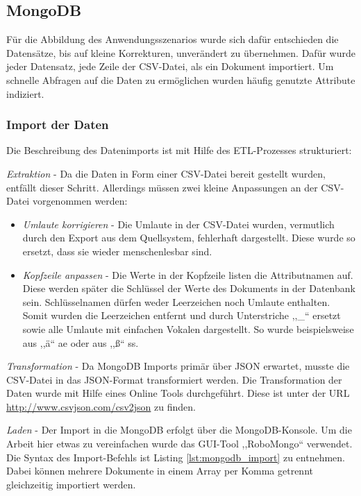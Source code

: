 \subsection{MongoDB}
Für die Abbildung des Anwendungsszenarios wurde sich dafür entschieden die Datensätze, bis auf kleine Korrekturen, unverändert zu übernehmen. Dafür wurde jeder Datensatz, jede Zeile der CSV-Datei, als ein Dokument importiert. Um schnelle Abfragen auf die Daten zu ermöglichen wurden häufig genutzte Attribute indiziert.

\subsubsection{Import der Daten}
Die Beschreibung des Datenimports ist mit Hilfe des ETL-Prozesses strukturiert:

\emph{Extraktion} -
Da die Daten in Form einer CSV-Datei bereit gestellt wurden, entfällt dieser Schritt. Allerdings müssen zwei kleine Anpassungen an der CSV-Datei vorgenommen werden:

\begin{itemize}
\item \textit{Umlaute korrigieren} - Die Umlaute in der CSV-Datei wurden, vermutlich durch den Export aus dem Quellsystem, fehlerhaft dargestellt. Diese wurde so ersetzt, dass sie wieder menschenlesbar sind.
\item \textit{Kopfzeile anpassen} - Die Werte in der Kopfzeile listen die Attributnamen auf. Diese werden später die Schlüssel der Werte des Dokuments in der Datenbank sein. Schlüsselnamen dürfen weder Leerzeichen noch Umlaute enthalten. Somit wurden die Leerzeichen entfernt und durch Unterstriche ,,\_`` ersetzt sowie alle Umlaute mit einfachen Vokalen dargestellt. So wurde beispielsweise aus ,,\"a`` ae oder aus ,,\ss{}`` ss.
\end{itemize}

\emph{Transformation} -
Da MongoDB Imports primär über JSON erwartet, musste die CSV-Datei in das JSON-Format transformiert werden. Die Transformation der Daten wurde mit Hilfe eines Online Tools durchgeführt. Diese ist unter der URL \url{http://www.csvjson.com/csv2json} \citep{drapeau01} zu finden.

\emph{Laden} -
Der Import in die MongoDB erfolgt über die MongoDB-Konsole. Um die Arbeit hier etwas zu vereinfachen wurde das GUI-Tool ,,RoboMongo`` verwendet. Die Syntax des Import-Befehls ist Listing \ref{lst:mongodb_import} zu entnehmen. Dabei können mehrere Dokumente in einem Array per Komma getrennt gleichzeitig importiert werden. \\

